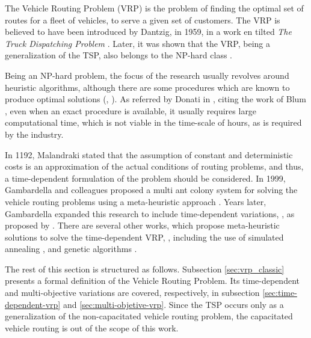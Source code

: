The Vehicle Routing Problem (VRP) is the problem of finding the optimal set of routes for a fleet of vehicles, to serve a given set of customers. The VRP is believed to have been introduced by Dantzig, in 1959, in a work en tilted \textit{The Truck Dispatching Problem} \cite{truck_problem_dantzig}. Later, it was shown that the VRP, being a generalization of the TSP, also belongs to the NP-hard class \cite{VRP_complexity}. 

Being an NP-hard problem, the focus of the research usually revolves around heuristic algorithms, although there are some procedures which are known to produce optimal solutions (\cite{VRP_exact_heuristic}, \cite{TDVRP_exact}). As referred by Donati in \cite{MACS_VRPTW}, citing the work of Blum \cite{blum_complexity},
even when an exact procedure is available, it usually requires large computational time, which is not viable in the time-scale of hours, as is required by the industry. 

In 1192, Malandraki \cite{TDVRP_92} stated that the assumption of constant and deterministic costs is an approximation of the actual conditions of routing problems, and thus, a time-dependent formulation of the problem should be considered. In 1999, Gambardella and colleagues proposed a multi ant colony system for solving the vehicle routing problems using a meta-heuristic approach \cite{MACS_VRPTW}. Years later, Gambardella expanded this research to include time-dependent variations, \cite{TDVRP_multi_objective_aco}, as proposed by \cite{TDVRP_92}. There are several other works, which propose meta-heuristic solutions to solve the time-dependent VRP, \cite{VRP_meta}, including the use of simulated annealing \cite{tdvrp_costs}, and genetic algorithms \cite{TDVRP_GA}. 

The rest of this section is structured as follows. Subsection \ref{sec:vrp_classic} presents a formal definition of the Vehicle Routing Problem. Its time-dependent and multi-objective variations are covered, respectively, in subsection \ref{sec:time-dependent-vrp} and \ref{sec:multi-objetive-vrp}. Since the TSP occurs only as a generalization of the non-capacitated vehicle routing problem,
the capacitated vehicle routing is out of the scope of this work.
